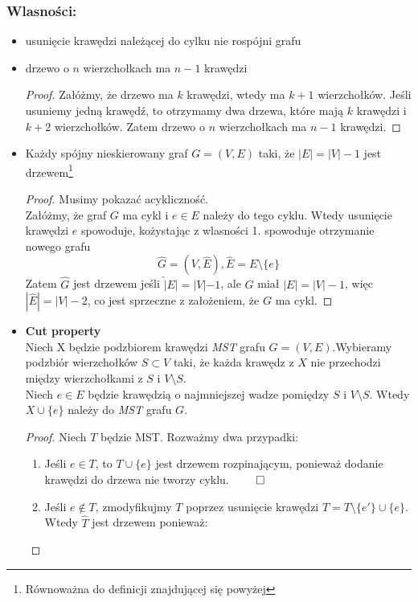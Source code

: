 \documentclass[11pt,a4paper]{article}
\begin{document}
\subsubsection*{Wlasności:}
\begin{itemize}
    \item usunięcie krawędzi należącej do cylku nie rospójni grafu
    \item drzewo o $n$ wierzchołkach ma $n-1$ krawędzi
        \begin{proof}
            Załóżmy, że drzewo ma $k$ krawędzi, wtedy ma $k+1$ wierzchołków. Jeśli usuniemy jedną krawędź, to otrzymamy dwa drzewa, które mają $k$ krawędzi i $k+2$ wierzchołków. Zatem drzewo o $n$ wierzchołkach ma $n-1$ krawędzi.
        \end{proof}
    \item Każdy spójny nieskierowany graf $G=(V,E)$ taki, że $|E|=|V| -1$ jest drzewem\footnote{Równoważna do definicji znajdującej się powyżej}
        \begin{proof}
            Musimy pokazać acykliczność.\\
            Załóżmy, że graf $G$ ma cykl i $e \in E$ należy do tego cyklu. Wtedy usunięcie krawędzi $e$ spowoduje, kożystając z wlasności 1. spowoduje otrzymanie nowego grafu
            \[
                \hat G = (V, \hat E), \hat E = E \setminus \{e\}
            \]
            Zatem $\hat G$ jest drzewem jeśli $\hat |E|=|V|-1$, ale $G$ miał $|E|=|V|-1$, więc $|\hat E|=|V|-2$, co jest sprzeczne z założeniem, że $G$ ma cykl.
        \end{proof}
    \item \textbf{Cut property}\\
        Niech X będzie podzbiorem krawędzi \textit{MST} grafu $G=(V,E)$.Wybieramy podzbiór wierzchołków $S \subset V$ taki, że każda krawędz z $X$ nie przechodzi między wierzchołkami z $S$ i $V \setminus S$. \\
        Niech $e\in E$ będzie krawędzią o najmniejszej wadze pomiędzy $S$ i $V \setminus S$. Wtedy $X\cup \{e\}$ należy do \textit{MST} grafu $G$.
        \begin{proof}
            Niech $T$ będzie MST. Rozważmy dwa przypadki:
            \begin{enumerate}
                \item Jeśli $e \in T$, to $T\cup \{e\}$ jest drzewem rozpinającym, ponieważ dodanie krawędzi do drzewa nie tworzy cyklu. $\qed$
                \item Jeśli $e \notin T$, zmodyfikujmy $T$ poprzez usunięcie krawędzi $\hat T = T\setminus \{e'\} \cup \{e\}$. Wtedy $\hat T$ jest drzewem ponieważ:

\end{enumerate}
\end{proof}
\end{itemize}
\end{document}
